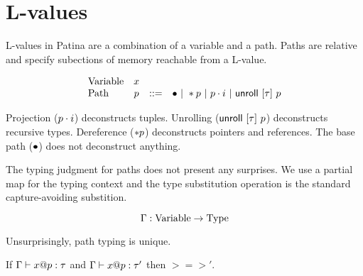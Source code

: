 \section*{L-values}

L-values in Patina are a combination of a variable and a path.
Paths are relative and specify subections of memory reachable from a L-value.

\[
\begin{array}{lccl}
\textrm{Variable} & x & & \\
\textrm{Path} & p & ::= & \bullet ~|~ *{p} ~|~ {p}\cdot{i} ~|~ \mathsf{unroll}~[{\tau}]~{p} \\
\end{array}
\]

Projection (${p}\cdot{i}$) deconstructs tuples.
Unrolling ($\mathsf{unroll}~[{\tau}]~{p}$) deconstructs recursive types.
Dereference ($*{p}$) deconstructs pointers and references.
The base path ($\bullet$) does not deconstruct anything.

The typing judgment for paths does not present any surprises.
We use a partial map for the typing context and
the type substitution operation is the standard capture-avoiding substition.

$$ \Gamma : \mathrm{Variable} \to \mathrm{Type} $$



Unsurprisingly, path typing is unique.
\begin{lem}
  If ${\Gamma} \vdash {{x}@{p}} : {\tau}$ and ${\Gamma} \vdash {{x}@{p}} : {\tau'}$ then $\gt = \gt' $.
\end{lem}

